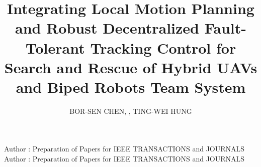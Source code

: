 \documentclass{ieeeaccess}
\begin{document}



\title{Integrating Local Motion Planning and Robust Decentralized Fault-Tolerant Tracking Control for Search and Rescue of Hybrid UAVs and Biped Robots Team System}

\author{\uppercase{Bor-Sen Chen}, , \uppercase{Ting-Wei Hung}}

\address[1]{Department of Electrical Engineering, National Tsing Hua
University, Hsinchu 30013, Taiwan} \address[2]{Department of Electrical
Engineering, Yuan Ze University, Taoyuan 32003, Taiwan}


\markboth
{Author \headeretal: Preparation of Papers for IEEE TRANSACTIONS and JOURNALS}
{Author \headeretal: Preparation of Papers for IEEE TRANSACTIONS and JOURNALS}



\end{document}
